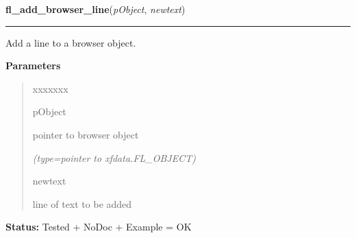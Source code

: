 \hspace{.8\funcindent}\begin{boxedminipage}{\funcwidth}

    \raggedright \textbf{fl\_add\_browser\_line}(\textit{pObject}, \textit{newtext})

    \vspace{-1.5ex}

    \rule{\textwidth}{0.5\fboxrule}
\setlength{\parskip}{2ex}
    Add a line to a browser object.

\setlength{\parskip}{1ex}
      \textbf{Parameters}
      \vspace{-1ex}

      \begin{quote}
        \begin{Ventry}{xxxxxxx}

          \item[pObject]

          pointer to browser object

            {\it (type=pointer to xfdata.FL\_OBJECT)}

          \item[newtext]

          line of text to be added

        \end{Ventry}

      \end{quote}

\textbf{Status:} Tested + NoDoc + Example = OK



    \end{boxedminipage}

    \label{xformslib:library:fl_addto_browser}

    \vspace{0.5ex}

